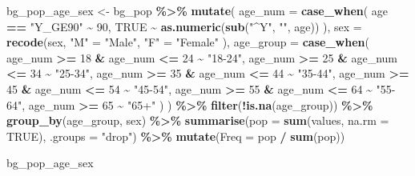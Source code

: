 \documentclass[
]{article}
\newenvironment{Shaded}{\begin{snugshade}}{\end{snugshade}}
\newcommand{\AttributeTok}[1]{\textcolor[rgb]{0.13,0.29,0.53}{#1}}
\newcommand{\ConstantTok}[1]{\textcolor[rgb]{0.56,0.35,0.01}{#1}}
\newcommand{\DecValTok}[1]{\textcolor[rgb]{0.00,0.00,0.81}{#1}}
\newcommand{\FunctionTok}[1]{\textcolor[rgb]{0.13,0.29,0.53}{\textbf{#1}}}
\newcommand{\NormalTok}[1]{#1}
\newcommand{\OtherTok}[1]{\textcolor[rgb]{0.56,0.35,0.01}{#1}}
\newcommand{\SpecialCharTok}[1]{\textcolor[rgb]{0.81,0.36,0.00}{\textbf{#1}}}
\newcommand{\StringTok}[1]{\textcolor[rgb]{0.31,0.60,0.02}{#1}}
\begin{document}
\begin{Shaded}
\begin{Highlighting}[]
\NormalTok{bg\_pop\_age\_sex }\OtherTok{\textless{}{-}}\NormalTok{ bg\_pop }\SpecialCharTok{\%\textgreater{}\%}
  \FunctionTok{mutate}\NormalTok{(}
    \AttributeTok{age\_num =} \FunctionTok{case\_when}\NormalTok{(}
\NormalTok{      age }\SpecialCharTok{==} \StringTok{"Y\_GE90"} \SpecialCharTok{\textasciitilde{}} \DecValTok{90}\NormalTok{,}
      \ConstantTok{TRUE} \SpecialCharTok{\textasciitilde{}} \FunctionTok{as.numeric}\NormalTok{(}\FunctionTok{sub}\NormalTok{(}\StringTok{"\^{}Y"}\NormalTok{, }\StringTok{""}\NormalTok{, age))}
\NormalTok{    ),}
    \AttributeTok{sex =} \FunctionTok{recode}\NormalTok{(sex,}
      \StringTok{"M"} \OtherTok{=} \StringTok{"Male"}\NormalTok{,}
      \StringTok{"F"} \OtherTok{=} \StringTok{"Female"}
\NormalTok{    ),}
    \AttributeTok{age\_group =} \FunctionTok{case\_when}\NormalTok{(}
\NormalTok{      age\_num }\SpecialCharTok{\textgreater{}=} \DecValTok{18} \SpecialCharTok{\&}\NormalTok{ age\_num }\SpecialCharTok{\textless{}=} \DecValTok{24} \SpecialCharTok{\textasciitilde{}} \StringTok{"18{-}24"}\NormalTok{,}
\NormalTok{      age\_num }\SpecialCharTok{\textgreater{}=} \DecValTok{25} \SpecialCharTok{\&}\NormalTok{ age\_num }\SpecialCharTok{\textless{}=} \DecValTok{34} \SpecialCharTok{\textasciitilde{}} \StringTok{"25{-}34"}\NormalTok{,}
\NormalTok{      age\_num }\SpecialCharTok{\textgreater{}=} \DecValTok{35} \SpecialCharTok{\&}\NormalTok{ age\_num }\SpecialCharTok{\textless{}=} \DecValTok{44} \SpecialCharTok{\textasciitilde{}} \StringTok{"35{-}44"}\NormalTok{,}
\NormalTok{      age\_num }\SpecialCharTok{\textgreater{}=} \DecValTok{45} \SpecialCharTok{\&}\NormalTok{ age\_num }\SpecialCharTok{\textless{}=} \DecValTok{54} \SpecialCharTok{\textasciitilde{}} \StringTok{"45{-}54"}\NormalTok{,}
\NormalTok{      age\_num }\SpecialCharTok{\textgreater{}=} \DecValTok{55} \SpecialCharTok{\&}\NormalTok{ age\_num }\SpecialCharTok{\textless{}=} \DecValTok{64} \SpecialCharTok{\textasciitilde{}} \StringTok{"55{-}64"}\NormalTok{,}
\NormalTok{      age\_num }\SpecialCharTok{\textgreater{}=} \DecValTok{65}               \SpecialCharTok{\textasciitilde{}} \StringTok{"65+"}
\NormalTok{    )}
\NormalTok{  ) }\SpecialCharTok{\%\textgreater{}\%}
  \FunctionTok{filter}\NormalTok{(}\SpecialCharTok{!}\FunctionTok{is.na}\NormalTok{(age\_group)) }\SpecialCharTok{\%\textgreater{}\%}
  \FunctionTok{group\_by}\NormalTok{(age\_group, sex) }\SpecialCharTok{\%\textgreater{}\%}
  \FunctionTok{summarise}\NormalTok{(}\AttributeTok{pop =} \FunctionTok{sum}\NormalTok{(values, }\AttributeTok{na.rm =} \ConstantTok{TRUE}\NormalTok{), }\AttributeTok{.groups =} \StringTok{"drop"}\NormalTok{) }\SpecialCharTok{\%\textgreater{}\%}
  \FunctionTok{mutate}\NormalTok{(}\AttributeTok{Freq =}\NormalTok{ pop }\SpecialCharTok{/} \FunctionTok{sum}\NormalTok{(pop))}

\NormalTok{bg\_pop\_age\_sex}
\end{Highlighting}
\end{Shaded}
\end{document}
